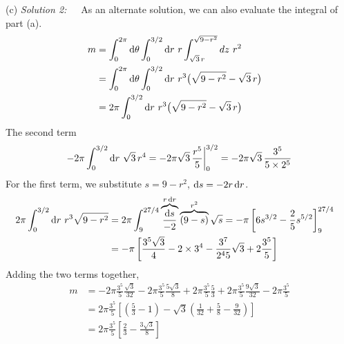 \begin{solution}
(c) \emph{Solution 2:}\ \ \ 
As an alternate solution, we can also evaluate the integral of part (a).
\begin{align*}
m&=\int_0^{2\pi}\dee{\theta}\int_0^{3/2}\dee{r}\ r\int_{\sqrt{3}\,r}^{\sqrt{9-r^2}}dz\ r^2\cr
&=\int_0^{2\pi}\dee{\theta}\int_0^{3/2}\dee{r}\ r^3\big(\sqrt{9-r^2}-\sqrt{3}\,r\big)\cr
&=2\pi\int_0^{3/2}\dee{r}\ r^3\big(\sqrt{9-r^2}-\sqrt{3}\,r\big)
\end{align*}
The second term
\begin{equation*}
-2\pi\int_0^{3/2}\dee{r}\ \sqrt{3}\,r^4=-2\pi\sqrt{3}\,\frac{r^5}{5}\bigg|_0^{3/2}
=-2\pi\sqrt{3}\,\frac{3^5}{5\times  2^5}
\end{equation*}
For the first term, we substitute $s=9-r^2$, $\mathrm{d}s=-2r\,\mathrm{d}r$.
\begin{align*}
2\pi\int_0^{3/2}\mathrm{d}r\ r^3\sqrt{9-r^2}
&=2\pi\int_9^{27/4}\overbrace{\frac{\mathrm{d}s}{-2}}^{r\,\mathrm{d}r}
        \overbrace{(9-s)}^{r^2} \sqrt{s}
=-\pi \left[6s^{3/2}-\frac{2}{5}s^{5/2}\right]_9^{27/4}\cr
&=-\pi \left[\frac{3^5\sqrt{3}}{4}-2\times 3^4
         -\frac{3^7}{2^4 5}\sqrt{3}+2\frac{3^5}{5}\right]
\end{align*}
Adding the two terms together,
\begin{align*}
m&=-2\pi\frac{3^5}{5} \frac{\sqrt{3}}{32}
   -2\pi\frac{3^5}{5} \frac{5\sqrt{3}}{8}
   +2\pi\frac{3^5}{5} \frac{5}{3}
   +2\pi\frac{3^5}{5} \frac{9\sqrt{3}}{32}
   -2\pi\frac{3^5}{5}
\\
&=2\pi\frac{3^5}{5}\left[\left(\frac{5}{3}-1\right)
-\sqrt{3}\left(\frac{1}{32}+\frac{5}{8}-\frac{9}{32}\right)\right] \\
&=2\pi \frac{3^5}{5} \left[\frac{2}{3}-\frac{3\sqrt{3}}{8}\right]
\end{align*}

\end{solution}
